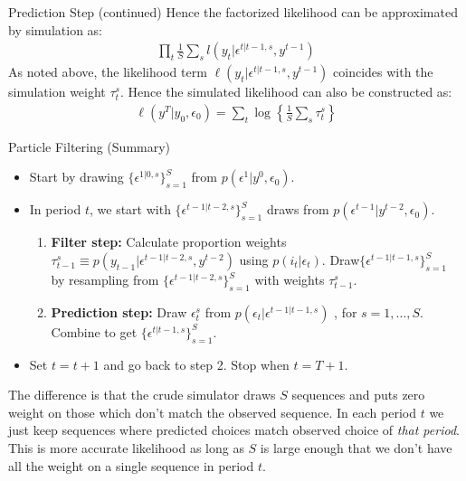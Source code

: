 \begin{frame}{Prediction Step (continued)}
Hence the factorized likelihood can be approximated by simulation as:
\begin{align*}
\prod_t \frac{1}{S} \sum_s l (y_t | \epsilon^{t|t-1,s},y^{t-1})
\end{align*}
As noted above, the likelihood term $\ell(y_t | \epsilon^{t | t-1,s},y^{t-1})$ coincides with the simulation weight $\tau_t^s$. Hence the simulated likelihood can also be constructed as:
\begin{align*}
\ell (y^T | y_0, \epsilon_0) = \sum_t \log \left\{ \frac{1}{S} \sum_s \tau_t^s \right\}
\end{align*}
\end{frame}

\begin{frame}{Particle Filtering (Summary)}
\begin{itemize}
\item Start by drawing $\{ \epsilon^{1|0,s}\}_{s=1}^S$ from $p(\epsilon^1 | y^0, \epsilon_0)$.
\item In period $t$, we start with $\{ \epsilon^{t-1|t-2,s}\}_{s=1}^S$ draws from $p(\epsilon^{t-1} | y^{t-2},\epsilon_0)$.
\begin{enumerate}
\item \textbf{Filter step:} Calculate proportion weights $\tau_{t-1}^s \equiv p(y_{t-1} | \epsilon^{t-1 | t-2,s}, y^{t-2}) $ using $p(i_t | \epsilon_t)$. Draw$\{\epsilon^{t-1 | t-1,s}\}_{s=1}^S$ by resampling from $\{ \epsilon^{t-1|t-2,s}\}_{s=1}^S$ with weights $\tau_{t-1}^s$.
\item \textbf{Prediction step:} Draw $\epsilon_t^s$ from $p(\epsilon_t | \epsilon^{t-1 | t-1,s})$ , for $s=1,\ldots,S$. Combine to get 
$\{ \epsilon^{t | t-1,s} \}_{s=1}^S$.
\end{enumerate}
\item Set $t=t+1$ and go back to step 2.  Stop when $t=T+1$.
\end{itemize}
The difference is that the crude simulator draws $S$ sequences and puts zero weight on those which don't match the observed sequence. In each period $t$ we just keep sequences where predicted choices match observed choice of \textit{that period}. This is more accurate likelihood as long as $S$ is large enough that we don't have all the weight on a single sequence in period $t$.
\end{frame}


